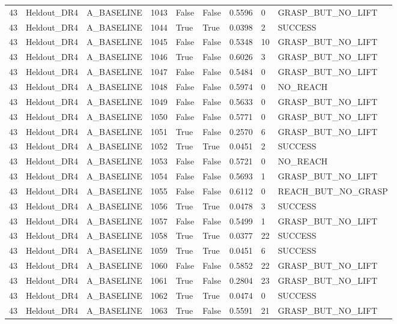 \documentclass[11pt,a4paper,oneside]{book}
\begin{document}
\begin{longtable}{l l l l l l l l l}
43 & Heldout\_DR4 & A\_BASELINE & 1043 & False & False & 0.5596 & 0 & GRASP\_BUT\_NO\_LIFT \\
43 & Heldout\_DR4 & A\_BASELINE & 1044 & True & True & 0.0398 & 2 & SUCCESS \\
43 & Heldout\_DR4 & A\_BASELINE & 1045 & False & False & 0.5348 & 10 & GRASP\_BUT\_NO\_LIFT \\
43 & Heldout\_DR4 & A\_BASELINE & 1046 & True & False & 0.6026 & 3 & GRASP\_BUT\_NO\_LIFT \\
43 & Heldout\_DR4 & A\_BASELINE & 1047 & False & False & 0.5484 & 0 & GRASP\_BUT\_NO\_LIFT \\
43 & Heldout\_DR4 & A\_BASELINE & 1048 & False & False & 0.5974 & 0 & NO\_REACH \\
43 & Heldout\_DR4 & A\_BASELINE & 1049 & False & False & 0.5633 & 0 & GRASP\_BUT\_NO\_LIFT \\
43 & Heldout\_DR4 & A\_BASELINE & 1050 & False & False & 0.5771 & 0 & GRASP\_BUT\_NO\_LIFT \\
43 & Heldout\_DR4 & A\_BASELINE & 1051 & True & False & 0.2570 & 6 & GRASP\_BUT\_NO\_LIFT \\
43 & Heldout\_DR4 & A\_BASELINE & 1052 & True & True & 0.0451 & 2 & SUCCESS \\
43 & Heldout\_DR4 & A\_BASELINE & 1053 & False & False & 0.5721 & 0 & NO\_REACH \\
43 & Heldout\_DR4 & A\_BASELINE & 1054 & False & False & 0.5693 & 1 & GRASP\_BUT\_NO\_LIFT \\
43 & Heldout\_DR4 & A\_BASELINE & 1055 & False & False & 0.6112 & 0 & REACH\_BUT\_NO\_GRASP \\
43 & Heldout\_DR4 & A\_BASELINE & 1056 & True & True & 0.0478 & 3 & SUCCESS \\
43 & Heldout\_DR4 & A\_BASELINE & 1057 & False & False & 0.5499 & 1 & GRASP\_BUT\_NO\_LIFT \\
43 & Heldout\_DR4 & A\_BASELINE & 1058 & True & True & 0.0377 & 22 & SUCCESS \\
43 & Heldout\_DR4 & A\_BASELINE & 1059 & True & True & 0.0451 & 6 & SUCCESS \\
43 & Heldout\_DR4 & A\_BASELINE & 1060 & False & False & 0.5852 & 22 & GRASP\_BUT\_NO\_LIFT \\
43 & Heldout\_DR4 & A\_BASELINE & 1061 & True & False & 0.2804 & 23 & GRASP\_BUT\_NO\_LIFT \\
43 & Heldout\_DR4 & A\_BASELINE & 1062 & True & True & 0.0474 & 0 & SUCCESS \\
43 & Heldout\_DR4 & A\_BASELINE & 1063 & True & False & 0.5591 & 21 & GRASP\_BUT\_NO\_LIFT \\

\end{longtable}
\end{document}
